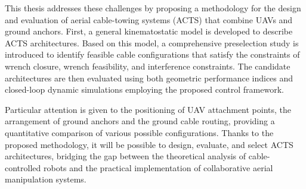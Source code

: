 
This thesis addresses these challenges by proposing a methodology for the design and evaluation of aerial cable-towing systems (ACTS) that combine UAVs and ground anchors. First, a general kinematostatic model is developed to describe ACTS architectures. Based on this model, a comprehensive preselection study is introduced to identify feasible cable configurations that satisfy the constraints of wrench closure, wrench feasibility, and interference constraints. The candidate architectures are then evaluated using both geometric performance indices and closed-loop dynamic simulations employing the proposed control framework.


Particular attention is given to the positioning of UAV attachment points, the arrangement of ground anchors and the ground cable routing, providing a quantitative comparison of various possible configurations. Thanks to the proposed methodology, it will be possible to design, evaluate, and select ACTS architectures, bridging the gap between the theoretical analysis of cable-controlled robots and the practical implementation of collaborative aerial manipulation systems.